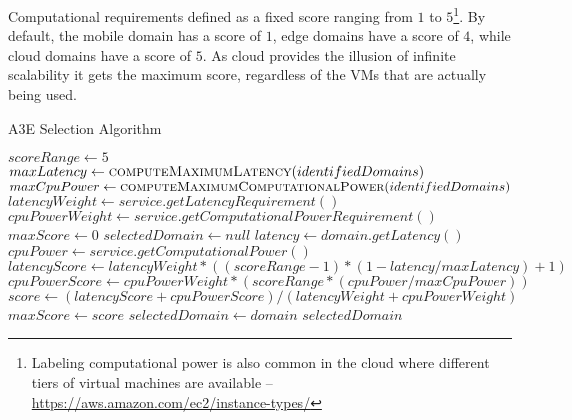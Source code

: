 %	
%	
%	

Computational requirements defined as a fixed score ranging from $1$ to $5$\footnote{Labeling computational power is also common in the cloud where different tiers of virtual machines are available -- \url{https://aws.amazon.com/ec2/instance-types/}}. By default, the mobile domain has a score of $1$, edge domains have a score of $4$, while cloud domains have a score of $5$. As cloud provides the illusion of infinite scalability it gets the maximum score, regardless of the VMs that are actually being used. 

\setlength{\textfloatsep}{5pt}%
{\scriptsize
\begin{algorithm}[h]
	\caption{A3E Selection Algorithm}
	\label{alg:selection}
	\begin{algorithmic}[1]		
		\State$scoreRange \gets 5$
		\State $maxLatency \gets \Call{computeMaximumLatency}{identifiedDomains}$
		\State $maxCpuPower \gets \Call{computeMaximumComputationalPower}{identifiedDomains}$
		\State $latencyWeight \gets service.getLatencyRequirement()$ 
		\State $cpuPowerWeight \gets service.getComputationalPowerRequirement()$ 
		\State $maxScore \gets 0$
		\State $selectedDomain \gets null$
		\State $latency \gets domain.getLatency()$ 
		\State $cpuPower \gets service.getComputationalPower()$ 
		\State $latencyScore \gets latencyWeight*((scoreRange-1)*(1 - latency/maxLatency)+1)$ 
		\State $cpuPowerScore \gets cpuPowerWeight*(scoreRange*(cpuPower/maxCpuPower))$
		\State $score \gets (latencyScore + cpuPowerScore) / (latencyWeight + cpuPowerWeight)$
		\State $maxScore \gets score$
		\State $selectedDomain \gets domain$
		\EndIf
		\EndFor 
		\State \Return $selectedDomain$
		\EndFunction
	\end{algorithmic}
\end{algorithm}
}%

